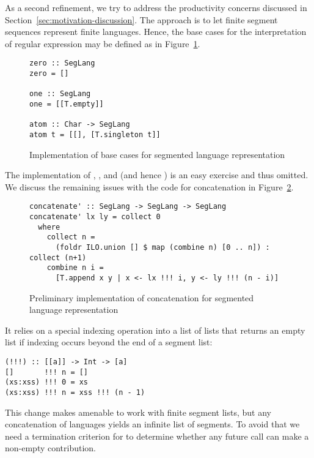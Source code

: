 As a second refinement, we try to address the productivity concerns
discussed in Section~\ref{sec:motivation-discussion}. The approach is
to let finite segment sequences represent finite languages. Hence, the
base cases for the interpretation of regular expression may be defined
as in Figure~\ref{fig:base-cases-segmented}.
\begin{figure}[tp]
\begin{lstlisting}
zero :: SegLang
zero = []

one :: SegLang
one = [[T.empty]]

atom :: Char -> SegLang
atom t = [[], [T.singleton t]]
\end{lstlisting}
  \caption{Implementation of base cases for segmented language representation}
  \label{fig:base-cases-segmented}
\end{figure}
The implementation of , , and
 (and hence ) is an easy exercise and thus omitted.
We discuss the remaining issues with the code for concatenation in
Figure~\ref{fig:preliminary-concatenation-segmented}. 
\begin{figure}[tp]
\begin{lstlisting}
concatenate' :: SegLang -> SegLang -> SegLang
concatenate' lx ly = collect 0
  where
    collect n =
      (foldr ILO.union [] $ map (combine n) [0 .. n]) : collect (n+1)
    combine n i =
      [T.append x y | x <- lx !!! i, y <- ly !!! (n - i)]
\end{lstlisting}
  \caption{Preliminary implementation of concatenation for segmented
    language representation}
  \label{fig:preliminary-concatenation-segmented}
\end{figure}
It relies on a special indexing operation into a list of lists that returns an empty
list if indexing occurs beyond the end of a segment list:
\begin{lstlisting}
(!!!) :: [[a]] -> Int -> [a]
[]       !!! n = []
(xs:xss) !!! 0 = xs
(xs:xss) !!! n = xss !!! (n - 1)
\end{lstlisting}
This change makes  amenable to work with finite
segment lists, 
but any concatenation of languages yields an infinite list of
segments. To avoid that we need a termination criterion for
 to determine whether any future call can make a
non-empty contribution.

